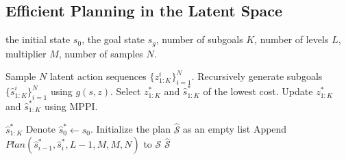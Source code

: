 \subsection{Efficient Planning in the Latent Space}

\begin{algorithm}[t]
\caption{$Plan(s_0, s_g, L, K, M, N)$}
\begin{algorithmic}[1]
\Require the initial state $s_0$, the goal state $s_g$, number of subgoals $K$, number of levels $L$, multiplier $M$, number of samples $N$.

\State Sample $N$ latent action sequences $\{z_{1:K}^i\}_{i=1}^N$.
\State Recursively generate subgoals $\{\hat{s}_{1:K}^i\}_{i=1}^N$ using $g(s, z)$.
\State Select $z_{1:K}^*$ and $\hat{s}_{1:K}^*$ of the lowest cost.
\State Update $z_{1:K}^*$ and $\hat{s}_{1:K}^*$ using MPPI.

    \State \Return $\hat{s}_{1:K}^*$
\Else
    \State Denote $\hat{s}_0^* \leftarrow s_0$.
    \State Initialize the plan $\hat{\mathcal{S}}$ as an empty list
        \State Append $Plan(\hat{s}_{i-1}^*, \hat{s}_{i}^*, L - 1, M, M, N)$ to $\mathcal{S}$
    \EndFor
    \State \Return $\hat{\mathcal{S}}$
\EndIf

\end{algorithmic}
\label{algo:planning}
\end{algorithm}



